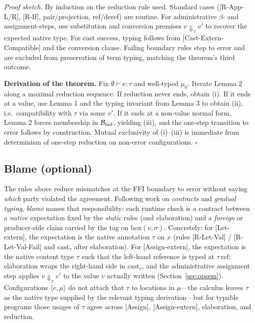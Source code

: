 \documentclass[11pt,a4paper]{article}
\begin{document}
\emph{Proof sketch.}
By induction on the reduction rule used.
Standard cases (\textsf{[R-App-L/R]}, \textsf{[R-If]}, pair/projection, ref/deref) are routine.
For administrative $\beta$- and assignment-steps, use substitution and conversion premises $v\Downarrow_{\tau}v'$ to recover the expected native type.
For cast success, typing follows from \textsf{[Cast-Extern-Compatible]} and the conversion clause.
Failing boundary rules step to $\text{error}$ and are excluded from preservation of term typing, matching the theorem's third outcome.

\medskip
\noindent\textbf{Derivation of the theorem.}
Fix $\emptyset\vdash e:\tau$ and well-typed $\mu_0$.
Iterate Lemma 2 along a maximal reduction sequence.
If reduction never ends, obtain (i).
If it ends at a value, use Lemma 1 and the typing invariant from Lemma 3 to obtain (ii), i.e.\ compatibility with $\tau$ via some $v'$.
If it ends at a non-value normal form, Lemma 2 forces membership in $\mathcal{B}_{\textnormal{fail}}$, yielding (iii), and the one-step transition to $\text{error}$ follows by construction.
Mutual exclusivity of (i)--(iii) is immediate from determinism of one-step reduction on non-error configurations.
\hfill$\square$

\subsection{Blame (optional)}

The rules above reduce mismatches at the FFI boundary to $\text{error}$ without saying \emph{which} party violated the agreement.
Following work on \emph{contracts} and \emph{gradual typing}, \emph{blame} names that responsibility: each runtime check is a contract between a \emph{native} expectation fixed by the \emph{static} rules (and elaboration) and a \emph{foreign} or producer-side claim carried by the tag on $\text{box}(v, \sigma)$.
Concretely: for \textsf{[{Let-extern}]}, the expectation is the native annotation $\tau$ on $x$ (rules \textsf{[R-Let-Val]} / \textsf{[R-Let-Val-Fail]} and $\text{cast}_{\tau}$ after elaboration).
For \textsf{[{Assign-extern}]}, the expectation is the native content type $\tau$ such that the left-hand reference is typed at $\tau\,\text{ref}$; elaboration wraps the right-hand side in $\text{cast}_{\tau}$, and the administrative assignment step applies $v \Downarrow_{\tau} v'$ to the value $v$ actually written (Section~\ref{sec:opsem}).
Configurations $\langle e, \mu \rangle$ do not attach that $\tau$ to locations in $\mu$---the calculus leaves $\tau$ as the native type supplied by the relevant typing derivation---but for typable programs those usages of $\tau$ agree across \textsf{[{Assign}]}, \textsf{[{Assign-extern}]}, elaboration, and reduction.
\end{document}
